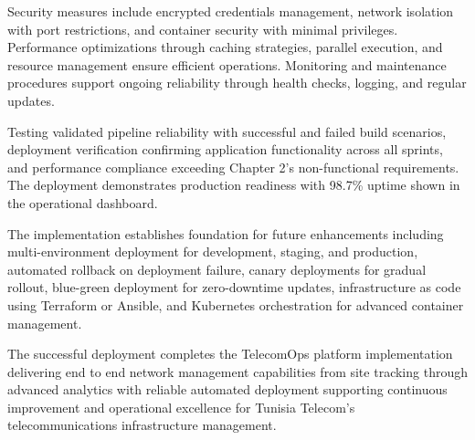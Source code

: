 Security measures include encrypted credentials management, network isolation with port restrictions, and container security with minimal privileges. Performance optimizations through caching strategies, parallel execution, and resource management ensure efficient operations. Monitoring and maintenance procedures support ongoing reliability through health checks, logging, and regular updates.

Testing validated pipeline reliability with successful and failed build scenarios, deployment verification confirming application functionality across all sprints, and performance compliance exceeding Chapter 2's non-functional requirements. The deployment demonstrates production readiness with 98.7\% uptime shown in the operational dashboard.

The implementation establishes foundation for future enhancements including multi-environment deployment for development, staging, and production, automated rollback on deployment failure, canary deployments for gradual rollout, blue-green deployment for zero-downtime updates, infrastructure as code using Terraform or Ansible, and Kubernetes orchestration for advanced container management.

The successful deployment completes the TelecomOps platform implementation delivering end to end network management capabilities from site tracking through advanced analytics with reliable automated deployment supporting continuous improvement and operational excellence for Tunisia Telecom's telecommunications infrastructure management.
